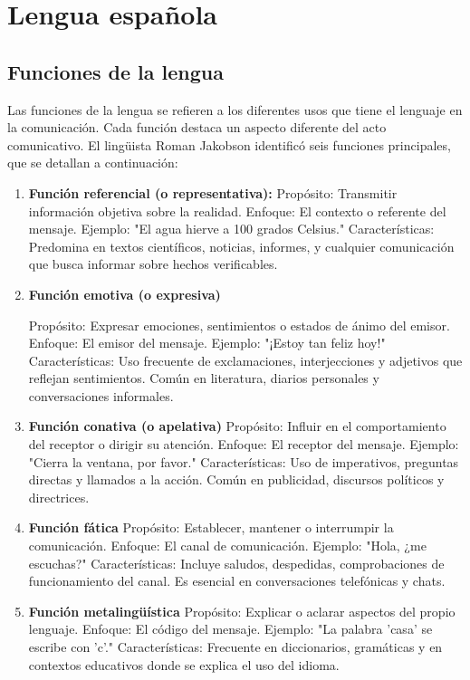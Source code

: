 \section{Lengua española}
\subsection{Funciones de la lengua}

Las funciones de la lengua se refieren a los diferentes usos que tiene el lenguaje en la comunicación. Cada función destaca un aspecto diferente del acto comunicativo. El lingüista Roman Jakobson identificó seis funciones principales, que se detallan a continuación:

\begin{enumerate}
   \item \textbf{Función referencial (o representativa):}
   Propósito: Transmitir información objetiva sobre la realidad.
   Enfoque: El contexto o referente del mensaje.
   Ejemplo: "El agua hierve a 100 grados Celsius."
   Características: Predomina en textos científicos, noticias, informes, y cualquier comunicación que busca informar sobre hechos verificables.

   \item \textbf{Función emotiva (o expresiva)}

   Propósito: Expresar emociones, sentimientos o estados de ánimo del emisor.
   Enfoque: El emisor del mensaje.
   Ejemplo: "¡Estoy tan feliz hoy!"
   Características: Uso frecuente de exclamaciones, interjecciones y adjetivos que reflejan sentimientos. Común en literatura, diarios personales y conversaciones informales.

   \item \textbf{Función conativa (o apelativa)}
   Propósito: Influir en el comportamiento del receptor o dirigir su atención.
   Enfoque: El receptor del mensaje.
   Ejemplo: "Cierra la ventana, por favor."
   Características: Uso de imperativos, preguntas directas y llamados a la acción. Común en publicidad, discursos políticos y directrices.

   \item \textbf{Función fática}
   Propósito: Establecer, mantener o interrumpir la comunicación.
   Enfoque: El canal de comunicación.
   Ejemplo: "Hola, ¿me escuchas?"
   Características: Incluye saludos, despedidas, comprobaciones de funcionamiento del canal. Es esencial en conversaciones telefónicas y chats.

   \item \textbf{Función metalingüística}
   Propósito: Explicar o aclarar aspectos del propio lenguaje.
   Enfoque: El código del mensaje.
   Ejemplo: "La palabra 'casa' se escribe con 'c'."
   Características: Frecuente en diccionarios, gramáticas y en contextos educativos donde se explica el uso del idioma.


\end{enumerate}
